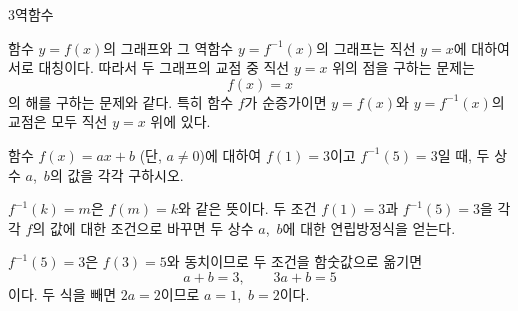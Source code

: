 \documentclass[10pt]{article}
\begin{document}
\begin{dmconcept}{3}{역함수}

함수 $y = f(x)$의 그래프와 그 역함수 $y = f^{-1}(x)$의 그래프는 직선 $y = x$에 대하여 서로 대칭이다. 따라서 두 그래프의 교점 중 직선 $y = x$ 위의 점을 구하는 문제는
\begin{equation*}
  f(x) = x
\end{equation*}
의 해를 구하는 문제와 같다. 특히 함수 $f$가 순증가이면 $y = f(x)$와 $y = f^{-1}(x)$의 교점은 모두 직선 $y = x$ 위에 있다.

\vspace{28.0mm}%
\end{dmconcept}

\newpage


\begin{dmproblem}
함수 $f(x) = ax + b$ (단, $a \ne 0$)에 대하여 $f(1) = 3$이고 $f^{-1}(5) = 3$일 때, 두 상수 $a$,\ $b$의 값을 각각 구하시오.
\end{dmproblem}

\begin{dmapproach}
$f^{-1}(k) = m$은 $f(m) = k$와 같은 뜻이다. 두 조건 $f(1) = 3$과 $f^{-1}(5) = 3$을 각각 $f$의 값에 대한 조건으로 바꾸면 두 상수 $a$,\ $b$에 대한 연립방정식을 얻는다.
\end{dmapproach}

\begin{dmsolution}
$f^{-1}(5) = 3$은 $f(3) = 5$와 동치이므로 두 조건을 함숫값으로 옮기면
\begin{equation*}
  a + b = 3,\qquad 3a + b = 5
\end{equation*}
이다. 두 식을 빼면 $2a = 2$이므로 $a = 1$,\ $b = 2$이다.
\end{dmsolution}

\dmchecktitle



\newpage

\end{document}

